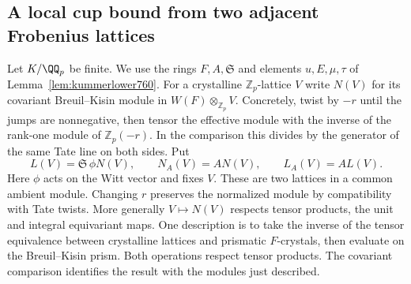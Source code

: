 \documentclass[a4paper,11pt]{article}
\theoremstyle{definition}
\theoremstyle{remark}
\newcommand{\ZZ}{\mathbb Z}\newcommand{\ord}{\operatorname{ord}}
\numberwithin{equation}{section}
\begin{document}
\subsection{A local cup bound from two adjacent Frobenius lattices}
\label{sec:adjacentcups762}
Let \(K/\QQ_p\) be finite. We use the rings \(F,A,\mathfrak S\)
and elements \(u,E,\mu,\tau\) of Lemma~\ref{lem:kummerlower760}.
For a crystalline \(\ZZ_p\)-lattice \(V\) write \(N(V)\) for
its covariant Breuil--Kisin module in \(W(F)\otimes_{\ZZ_p}V\).
Concretely, twist by \(-r\) until the jumps are nonnegative,
then tensor the effective module with the inverse of the
rank-one module of \(\ZZ_p(-r)\). In the comparison this
divides by the generator of the same Tate line on both
sides. Put
\[
       L(V)=\mathfrak S\,\phi N(V),\qquad
       N_A(V)=A N(V),\qquad L_A(V)=A L(V).
\]
Here \(\phi\) acts on the Witt vector and fixes \(V\). These
are two lattices in a common ambient module. Changing \(r\)
preserves the normalized module by compatibility with Tate
twists. More generally \(V\mapsto N(V)\) respects tensor
products, the unit and integral equivariant maps. One
description is to take the inverse of the tensor equivalence
between crystalline lattices and prismatic \(F\)-crystals,
then evaluate on the Breuil--Kisin prism. Both operations
respect tensor products. The covariant comparison identifies
the result with the modules just described.
~\cite[Theorems~5.6 and~7.9]{III-II-prismatic762}~\cite[Sections~2--3]{III-II-cgmexact759}
\end{document}
